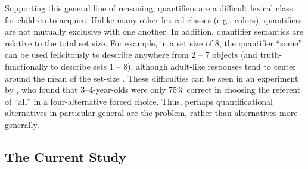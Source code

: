 \documentclass[man]{apa2}
\begin{document}
Supporting this general line of reasoning, quantifiers are a difficult lexical class for children to acquire. Unlike many other lexical classes (e.g., colors), quantifiers are not mutually exclusive with one another. In addition, quantifier semantics are relative to the total set size. For example, in a set size of 8, the quantifier ``some'' can be used felicitously to describe anywhere from 2 -- 7 objects \cite{barner2009} (and truth-functionally to describe sets 1 -- 8), although adult-like responses tend to center around the mean of the set-size \cite{franke2014}. These difficulties can be seen in an experiment by , who found that 3--4-year-olds were only 75\% correct in choosing the referent of ``all'' in a four-alternative forced choice. Thus, perhaps quantificational alternatives in particular general are the problem, rather than alternatives more generally.
%
%
%
%


\subsection{The Current Study}
\end{document}
